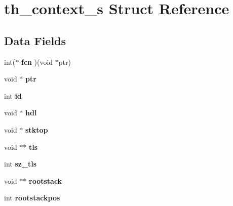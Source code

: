 \hypertarget{structth__context__s}{\section{th\-\_\-context\-\_\-s Struct Reference}
\label{structth__context__s}
}
\subsection*{Data Fields}
\begin{DoxyCompactItemize}
\item 
\hypertarget{structth__context__s_a5069b9b4fb371ee68f2f7f83705a30b7}{int($\ast$ {\bfseries fcn} )(void $\ast$ptr)}\label{structth__context__s_a5069b9b4fb371ee68f2f7f83705a30b7}

\item 
\hypertarget{structth__context__s_a66ed8b840baf4368d48ec3dd405ba233}{void $\ast$ {\bfseries ptr}}\label{structth__context__s_a66ed8b840baf4368d48ec3dd405ba233}

\item 
\hypertarget{structth__context__s_ab5118fc9795444c6787ecd1538837c06}{int {\bfseries id}}\label{structth__context__s_ab5118fc9795444c6787ecd1538837c06}

\item 
\hypertarget{structth__context__s_a9be80bd3ddf7e0e496867d2151bfd6e1}{void $\ast$ {\bfseries hdl}}\label{structth__context__s_a9be80bd3ddf7e0e496867d2151bfd6e1}

\item 
\hypertarget{structth__context__s_acf4c662fc7306fc04ec9fa373aa20c39}{void $\ast$ {\bfseries stktop}}\label{structth__context__s_acf4c662fc7306fc04ec9fa373aa20c39}

\item 
\hypertarget{structth__context__s_a2fcda9911950d17212aa57b6e96dc202}{void $\ast$$\ast$ {\bfseries tls}}\label{structth__context__s_a2fcda9911950d17212aa57b6e96dc202}

\item 
\hypertarget{structth__context__s_aa847d7e58c3e936ccef9aba2d945c5bd}{int {\bfseries sz\-\_\-tls}}\label{structth__context__s_aa847d7e58c3e936ccef9aba2d945c5bd}

\item 
\hypertarget{structth__context__s_a4671633b82ac1f964aabad95a76b23d5}{void $\ast$$\ast$ {\bfseries rootstack}}\label{structth__context__s_a4671633b82ac1f964aabad95a76b23d5}

\item 
\hypertarget{structth__context__s_a80bfb1004fe2ce4a6bdab5d67a1effc1}{int {\bfseries rootstackpos}}\label{structth__context__s_a80bfb1004fe2ce4a6bdab5d67a1effc1}


\end{DoxyCompactItemize}
